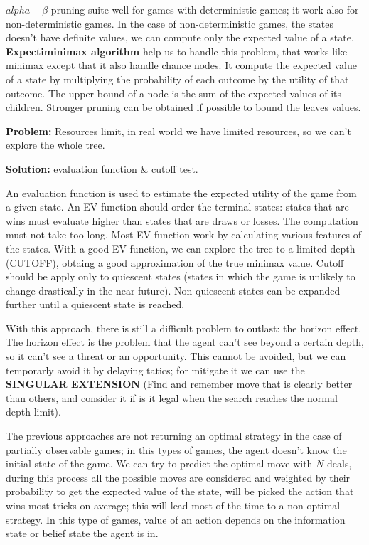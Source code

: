 \documentclass[12pt]{article}
\begin{document}
\begin{enumerate}[label=\textbf{AS.\arabic*}]
    $alpha - \beta$ pruning suite well for games with deterministic games; it work also for non-deterministic games.
    In the case of non-deterministic games, the states doesn't have definite values, we can compute only the expected value of a state.
    \textbf{Expectiminimax algorithm} help us to handle this problem, that works like minimax 
    except that it also handle chance nodes.
    It compute the expected value of a state by multiplying the probability of each outcome by the utility of that outcome.
    The upper bound of a node is the sum of the expected values of its children.
    Stronger pruning can be obtained if possible to bound the leaves values.

    \textbf{Problem:} Resources limit, in real world we have limited resources, so we can't explore the whole tree.
    
    \textbf{Solution:} evaluation function \& cutoff test.

    An evaluation function is used to estimate the expected utility of the game from a given state.
        An EV function should order the terminal states: 
        states that are wins must evaluate higher than states that are draws or losses.
        The computation must not take too long.
        Most EV function work by calculating various features of the states.
        With a good EV function, we can explore the tree to a limited depth (CUTOFF), obtaing a good approximation of the true minimax value.
        Cutoff should be apply only to quiescent states (states in which the game is unlikely to change drastically in the near future).
        Non quiescent states can be expanded further until a quiescent state is reached.
    
    With this approach, there is still a difficult problem to outlast: the horizon effect.
    The horizon effect is the problem that the agent can't see beyond a certain depth, so it can't see a threat or an opportunity.
    This cannot be avoided, but we can temporarly avoid it by delaying tatics; for mitigate it we can use the \textbf{SINGULAR EXTENSION} 
    (Find and remember move that is clearly better than others, and consider it if is it legal when the search reaches the normal depth limit).

    The previous approaches are not returning an optimal strategy in the case of partially observable games; in this types of games, 
    the agent doesn't know the initial state of the game.
    We can try to predict the optimal move with $N$ deals, during this process all the possible moves are considered and weighted by their probability 
    to get the expected value of the state, will be picked the action that wins most tricks on average;
    this will lead most of the time to a non-optimal strategy.
    In this type of games, value of an action depends on the information state or belief state the agent is in.


\end{enumerate}
\end{document}
